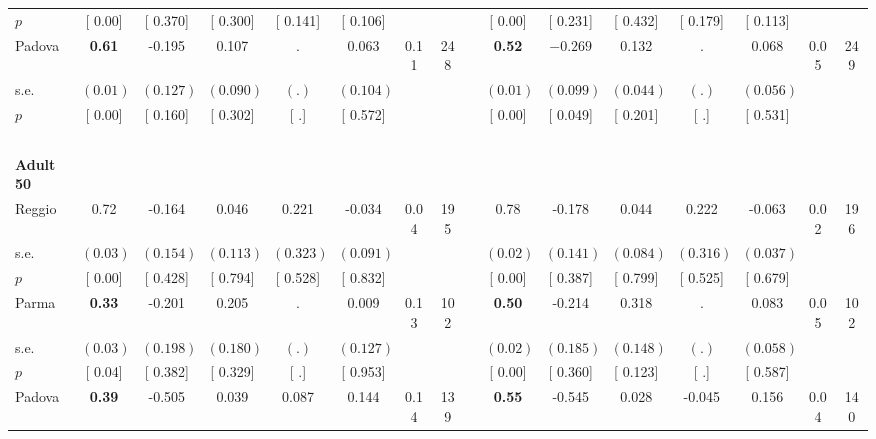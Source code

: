 \begin{longtable}{L{8em} c c c c c c c p{1em} c c c c c c c}
\quad \quad \quad \quad $ p$ & [     0.00] & [    0.370] & [    0.300] & [    0.141] & [    0.106] & & & & [     0.00] & [    0.231] & [    0.432] & [    0.179] & [    0.113] & &  \\[1em]
\quad \quad \quad Padova& \textbf{     0.61} &    -0.195 &     0.107 &         . &     0.063 &      0.11 &       248 & & \textbf{     0.52} & $ \mathbf{   -0.269}$ &     0.132 &         . &     0.068 &      0.05 &       249  \\*
\quad \quad \quad \quad s.e.& $ (     0.01)$ & $ (    0.127)$ & $ (    0.090)$ & $ (        .)$ & $ (    0.104)$ & & & & $ (     0.01)$ & $ (    0.099)$ & $ (    0.044)$ & $ (        .)$ & $ (    0.056)$ & &  \\*
\quad \quad \quad \quad $ p$ & [     0.00] & [    0.160] & [    0.302] & [        .] & [    0.572] & & & & [     0.00] & [    0.049] & [    0.201] & [        .] & [    0.531] & &  \\[1em]
~\\[1em]
\quad \quad \textbf{Adult 50} & & & & & & & & & & & & & & & \\* 
\quad \quad \quad Reggio& 0.72 &    -0.164 &     0.046 &     0.221 &    -0.034 &      0.04 &       195 & & 0.78 &    -0.178 &     0.044 &     0.222 &    -0.063 &      0.02 &       196  \\*
\quad \quad \quad \quad s.e.& $ (     0.03)$ & $ (    0.154)$ & $ (    0.113)$ & $ (    0.323)$ & $ (    0.091)$ & & & & $ (     0.02)$ & $ (    0.141)$ & $ (    0.084)$ & $ (    0.316)$ & $ (    0.037)$ & &  \\*
\quad \quad \quad \quad $ p$ & [     0.00] & [    0.428] & [    0.794] & [    0.528] & [    0.832] & & & & [     0.00] & [    0.387] & [    0.799] & [    0.525] & [    0.679] & &  \\[1em]
\quad \quad \quad Parma& \textbf{     0.33} &    -0.201 &     0.205 &         . &     0.009 &      0.13 &       102 & & \textbf{     0.50} &    -0.214 &     0.318 &         . &     0.083 &      0.05 &       102  \\*
\quad \quad \quad \quad s.e.& $ (     0.03)$ & $ (    0.198)$ & $ (    0.180)$ & $ (        .)$ & $ (    0.127)$ & & & & $ (     0.02)$ & $ (    0.185)$ & $ (    0.148)$ & $ (        .)$ & $ (    0.058)$ & &  \\*
\quad \quad \quad \quad $ p$ & [     0.04] & [    0.382] & [    0.329] & [        .] & [    0.953] & & & & [     0.00] & [    0.360] & [    0.123] & [        .] & [    0.587] & &  \\[1em]
\quad \quad \quad Padova& \textbf{     0.39} &    -0.505 &     0.039 &     0.087 &     0.144 &      0.14 &       139 & & \textbf{     0.55} &    -0.545 &     0.028 &    -0.045 &     0.156 &      0.04 &       140  \\*

\end{longtable}

